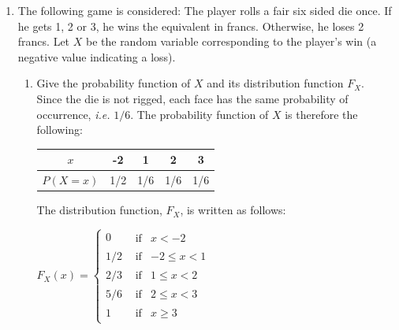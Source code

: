 \documentclass[12pt,thmsa]{article}\usepackage[]{graphicx}\usepackage[]{color}
\begin{document}
\begin{enumerate}
\item The following game is considered: The player rolls a fair six sided die once. If he gets 1, 2 or 3, he wins the equivalent in francs. Otherwise, he loses 2 francs. Let $ X $ be the random variable corresponding to the player's win (a negative value indicating a loss).

\begin{enumerate}%
\item Give the probability function of $X$ and its distribution function $F_X$.\\

Since the die is not rigged, each face has the same probability of occurrence, {\it i.e.} $ 1/6 $. The probability function of $ X $ is therefore the following:

			\begin{center}
			\begin{tabular}{|c|c|c|c|c|}
			\hline
			$x$ & -2 & 1 & 2 & 3 \\
			\hline
			$P(X=x)$ & 1/2 & 1/6 & 1/6 & 1/6\\
			\hline
			\end{tabular}
			\end{center}

The distribution function, $ F_X $, is written as follows:

            \begin{center}
			$F_X(x)=\begin{cases}
			0 & \begin{array}{cc} \textrm{if} & x<-2\end{array}\\
			1/2 & \begin{array}{cc} \textrm{if} & -2\leq x<1\end{array}\\
			2/3 & \begin{array}{cc}	\textrm{if} & 1\leq x<2\end{array}\\
            5/6 & \begin{array}{cc}	\textrm{if} & 2\leq x<3\end{array}\\
			1 & \begin{array}{cc} \textrm{if} &  x\geq 3\end{array}
			\end{cases}$
			\end{center}


\end{enumerate}
\end{enumerate}
\end{document}
